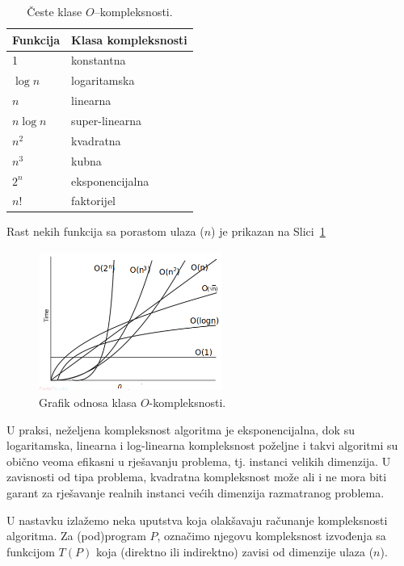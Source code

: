  \begin{table}[H]
 	   \caption{Česte klase $O$--kompleksnosti. }  \label{tab:kompleksnosti_funkcijea}
 	\centering 
 	\begin{tabular}{l |l} \hline 
 		\textbf{Funkcija}   &  \textbf{Klasa kompleksnosti} \\ \hline
 		1          & konstantna \\
 		$\log n$   & logaritamska \\
 		$n$        &  linearna \\
 		$n \log n$ & super-linearna  \\
 		$n^2$      & kvadratna \\
 		$n^3$      & kubna \\
 		$2^n $     & eksponencijalna \\ 
 		$n!$       & faktorijel \\
 		\hline
  	\end{tabular}

 \end{table}
 Rast nekih funkcija sa porastom ulaza ($n$) je prikazan na Slici~\ref{fig:kompleksnosti_funkcije}
 \begin{figure}[H]
 	\centering
 	\includegraphics[width=170pt,height=130pt]{slike/growth.png}%
   \caption{Grafik odnosa klasa $O$-kompleksnosti.}  \label{fig:kompleksnosti_funkcije}
 \end{figure}


U praksi, neželjena kompleksnost algoritma je eksponencijalna, dok su logaritamska, linearna i log-linearna kompleksnost poželjne i takvi algoritmi su obično veoma efikasni u rješavanju problema, tj. instanci velikih dimenzija. U zavisnosti od tipa problema, kvadratna kompleksnost može ali i ne mora biti garant za rješavanje realnih instanci većih dimenzija razmatranog  problema. %


U nastavku izlažemo neka uputstva koja olakšavaju računanje kompleksnosti algoritma. Za (pod)program $P$, označimo njegovu kompleksnost izvođenja sa funkcijom $T(P)$ koja (direktno ili indirektno) zavisi od dimenzije ulaza ($n$). 
 

